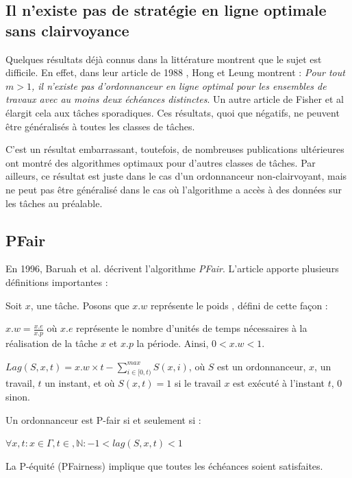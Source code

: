 	
	\subsection{Il n'existe pas de stratégie en ligne optimale sans clairvoyance}
	Quelques résultats déjà connus dans la littérature montrent que le sujet est difficile. 
	En effet, dans leur article de 1988 \cite{hong_-line_1988}, Hong et Leung montrent :\medskip
	\textit{\og Pour tout $m > 1$, il n'existe pas d'ordonnanceur en ligne optimal pour les ensembles 
	de travaux avec au moins deux échéances distinctes\fg{}}. 
	Un autre article de Fisher et al \cite{fisher_optimal_2010} élargit cela aux tâches sporadiques. 
	Ces résultats, quoi que négatifs, ne peuvent être généralisés à toutes les classes de tâches. 
	
	C'est un résultat embarrassant, toutefois, de nombreuses publications ultérieures ont montré des algorithmes 
	optimaux pour d'autres classes de tâches. 
	Par ailleurs, ce résultat est juste dans le cas d'un ordonnanceur non-clairvoyant, 
	mais ne peut pas être généralisé dans le cas où 
	l'algorithme a accès à des données sur les tâches au préalable.
	
	\subsection{PFair}
	En 1996, Baruah et al. décrivent l'algorithme \textit{PFair}. \cite{baruah_proportionate_1996}
	L'article apporte plusieurs définitions importantes :
	
	
	Soit $x$, une tâche. 
	Posons que $x.w$ représente le \og poids\fg{} , défini de cette façon : 
	
	$x.w = \frac{x.e}{x.p}$ où
	$x.e$ représente le nombre d'unités de temps nécessaires à la réalisation de la tâche 
	$x$	et $x.p$ la période. Ainsi, $0 < x.w < 1$.
	
	\begin{mydef}
		$Lag(S, x, t) = x.w \times t - \sum_{i\in[0,t)}^{max} S(x, i)$, où 
		$S$ est un ordonnanceur, $x$, un travail, $t$ un instant, et où $S(x, t) = 1$ si 
		le travail $x$ est exécuté à l'instant $t$, $0$ sinon.
	\end{mydef}
	\begin{mydef}
		Un ordonnanceur est P-fair si et seulement si :
		
		
		$\forall x, t : x \in \Gamma, t\in , \mathbb{N} : -1 < lag(S,x,t) < 1$
	\end{mydef}
	\begin{mytheorem}
		La P-équité (PFairness) implique que toutes les échéances soient satisfaites.
	\end{mytheorem}
	
